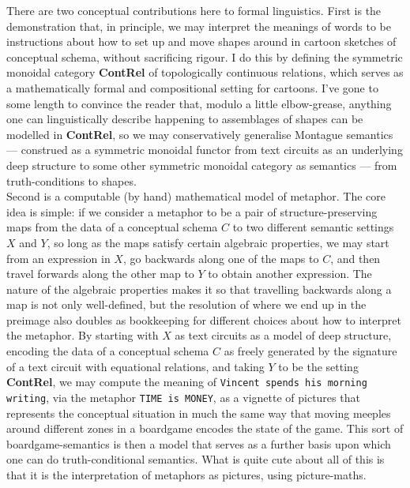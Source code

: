 There are two conceptual contributions here to formal linguistics. First is the demonstration that, in principle, we may interpret the meanings of words to be instructions about how to set up and move shapes around in cartoon sketches of conceptual schema, without sacrificing rigour. I do this by defining the symmetric monoidal category \textbf{ContRel} of topologically continuous relations, which serves as a mathematically formal and compositional setting for cartoons. I've gone to some length to convince the reader that, modulo a little elbow-grease, anything one can linguistically describe happening to assemblages of shapes can be modelled in \textbf{ContRel}, so we may conservatively generalise Montague semantics --- construed as a symmetric monoidal functor from text circuits as an underlying deep structure to some other symmetric monoidal category as semantics --- from truth-conditions to shapes.\\

Second is a computable (by hand) mathematical model of metaphor. The core idea is simple: if we consider a metaphor to be a pair of structure-preserving maps from the data of a conceptual schema $C$ to two different semantic settings $X$ and $Y$, so long as the maps satisfy certain algebraic properties, we may start from an expression in $X$, go backwards along one of the maps to $C$, and then travel forwards along the other map to $Y$ to obtain another expression. The nature of the algebraic properties makes it so that travelling backwards along a map is not only well-defined, but the resolution of where we end up in the preimage also doubles as bookkeeping for different choices about how to interpret the metaphor. By starting with $X$ as text circuits as a model of deep structure, encoding the data of a conceptual schema $C$ as freely generated by the signature of a text circuit with equational relations, and taking $Y$ to be the setting \textbf{ContRel}, we may compute the meaning of \texttt{Vincent spends his morning writing}, via the metaphor \texttt{TIME is MONEY}, as a vignette of pictures that represents the conceptual situation in much the same way that moving meeples around different zones in a boardgame encodes the state of the game. This sort of boardgame-semantics is then a model that serves as a further basis upon which one can do truth-conditional semantics. What is quite cute about all of this is that it is the interpretation of metaphors as pictures, using picture-maths.\\

